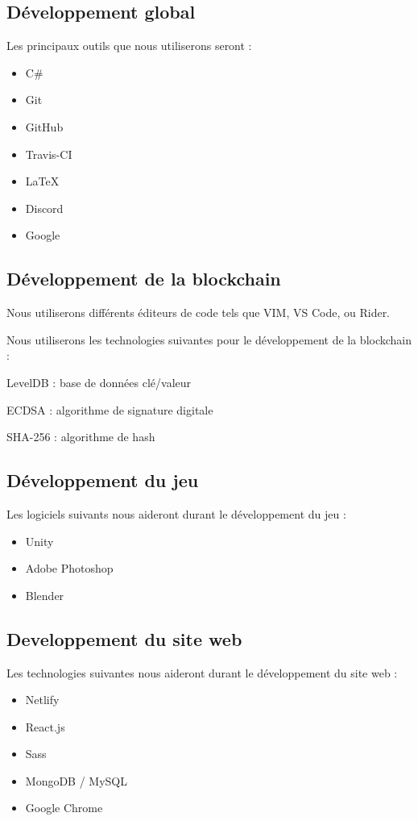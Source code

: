 \documentclass{article}
\begin{document}
\subsection{Développement global}
Les principaux outils que nous utiliserons seront :

\begin{itemize}
    \item C\#
    \item Git
    \item GitHub
    \item Travis-CI
    \item \LaTeX
    \item Discord
    \item Google

\end{itemize}

\subsection{Développement de la blockchain}
Nous utiliserons différents éditeurs de code tels que VIM, VS Code, ou Rider.

Nous utiliserons les technologies suivantes pour le développement de la blockchain :
\begin{itemize}
\begin{samepage}
    \item LevelDB : base de données clé/valeur
    \item ECDSA : algorithme de signature digitale
    \item SHA-256 : algorithme de hash
\end{samepage}
\end{itemize}

\subsection{Développement du jeu}

Les logiciels suivants nous aideront durant le développement du jeu :
\begin{itemize}
    \item Unity
    \item Adobe Photoshop
    \item Blender
\end{itemize}

\subsection{Developpement du site web}
Les technologies suivantes nous aideront durant le développement du site web :
\begin{itemize}
    \item Netlify
    \item React.js
    \item Sass
    \item MongoDB / MySQL
    \item Google Chrome
\end{itemize}
\end{document}
